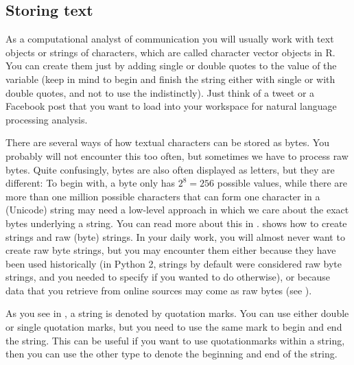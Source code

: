 



\subsection{Storing text}

As a computational analyst of communication you will usually work with
text objects or strings of characters, which are called character
vector objects in R. You can create them just by adding single or double quotes to the value of the variable (keep in mind to begin and finish the string either with single or with double quotes, and not to use the indistinctly). Just think of a tweet or a Facebook post that you want to load into your workspace for natural
language processing analysis.


There are several ways of how textual characters can be stored as
bytes. You probably will not encounter this too often, but sometimes
we have to process raw bytes. Quite confusingly, bytes are also often
displayed as letters, but they are different: To begin with, a byte
only has $2^8=256$ possible values, while there are more than one
million possible characters that can form one character in a (Unicode)
string may need a low-level approach in which we care about the exact
bytes underlying a string. You can read more about this in
.   shows how to create strings and raw
(byte) strings. In your daily work, you will almost never want to
create raw byte strings, but you may encounter them either because
they have been used historically (in Python 2, strings by default
were considered raw byte strings, and you needed to specify if
you wanted to do otherwise), or because data that you retrieve from
online sources may come as raw bytes (see ).

As you see in , a string is denoted by quotation
marks. You can use either double or single quotation marks, but you
need to use the same mark to begin and end the string. This can be
useful if you want to use quotationmarks within a string, then you can
use the other type to denote the beginning and end of the string.



